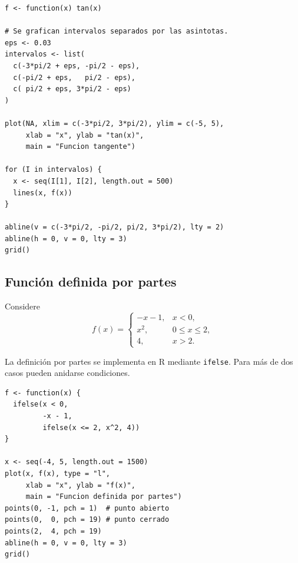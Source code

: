 \documentclass[12pt]{article}
\theoremstyle{remark}
\begin{document}
\begin{verbatim}
f <- function(x) tan(x)

# Se grafican intervalos separados por las asintotas.
eps <- 0.03
intervalos <- list(
  c(-3*pi/2 + eps, -pi/2 - eps),
  c(-pi/2 + eps,   pi/2 - eps),
  c( pi/2 + eps, 3*pi/2 - eps)
)

plot(NA, xlim = c(-3*pi/2, 3*pi/2), ylim = c(-5, 5),
     xlab = "x", ylab = "tan(x)",
     main = "Funcion tangente")

for (I in intervalos) {
  x <- seq(I[1], I[2], length.out = 500)
  lines(x, f(x))
}

abline(v = c(-3*pi/2, -pi/2, pi/2, 3*pi/2), lty = 2)
abline(h = 0, v = 0, lty = 3)
grid()
\end{verbatim}

\subsection*{Función definida por partes}

Considere
\[
f(x)=
\begin{cases}
-x-1,&x<0,\\
x^2,&0\leq x\leq2,\\
4,&x>2.
\end{cases}
\]

La definición por partes se implementa en R mediante \texttt{ifelse}. Para más
de dos casos pueden anidarse condiciones.

\begin{center}
\end{center}

\begin{verbatim}
f <- function(x) {
  ifelse(x < 0,
         -x - 1,
         ifelse(x <= 2, x^2, 4))
}

x <- seq(-4, 5, length.out = 1500)
plot(x, f(x), type = "l",
     xlab = "x", ylab = "f(x)",
     main = "Funcion definida por partes")
points(0, -1, pch = 1)  # punto abierto
points(0,  0, pch = 19) # punto cerrado
points(2,  4, pch = 19)
abline(h = 0, v = 0, lty = 3)
grid()
\end{verbatim}
\end{document}
